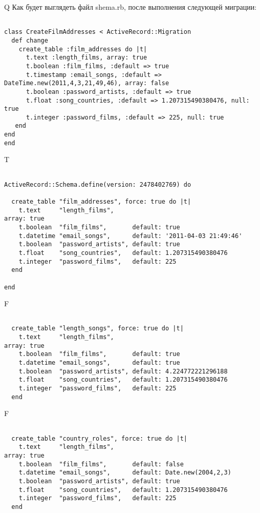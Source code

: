 Q
Как будет выглядеть файл shema.rb, после выполнения следующей миграции:

\begin{verbatim}

class CreateFilmAddresses < ActiveRecord::Migration 
  def change 
    create_table :film_addresses do |t| 
      t.text :length_films, array: true
      t.boolean :film_films, :default => true
      t.timestamp :email_songs, :default => DateTime.new(2011,4,3,21,49,46), array: false
      t.boolean :password_artists, :default => true
      t.float :song_countries, :default => 1.207315490380476, null: true
      t.integer :password_films, :default => 225, null: true
   end
end
end
\end{verbatim}

T
\begin{verbatim}

ActiveRecord::Schema.define(version: 2478402769) do

  create_table "film_addresses", force: true do |t|
    t.text     "length_films",                                     array: true
    t.boolean  "film_films",       default: true
    t.datetime "email_songs",      default: '2011-04-03 21:49:46'
    t.boolean  "password_artists", default: true
    t.float    "song_countries",   default: 1.207315490380476
    t.integer  "password_films",   default: 225
  end

end
\end{verbatim}


F
\begin{verbatim}

  create_table "length_songs", force: true do |t|
    t.text     "length_films",                                     array: true
    t.boolean  "film_films",       default: true
    t.datetime "email_songs",      default: true
    t.boolean  "password_artists", default: 4.224772221296188
    t.float    "song_countries",   default: 1.207315490380476
    t.integer  "password_films",   default: 225
  end

\end{verbatim}

F
\begin{verbatim}

  create_table "country_roles", force: true do |t|
    t.text     "length_films",                                     array: true
    t.boolean  "film_films",       default: false
    t.datetime "email_songs",      default: Date.new(2004,2,3)
    t.boolean  "password_artists", default: true
    t.float    "song_countries",   default: 1.207315490380476
    t.integer  "password_films",   default: 225
  end

\end{verbatim}

